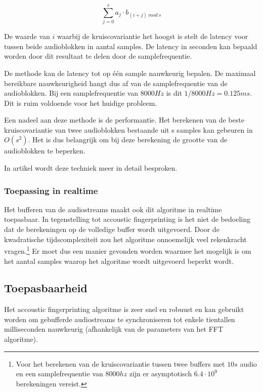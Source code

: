\begin{equation}
\sum_{j=0}^{s} a_{j} \cdot b_{(i+j)\ mod\ s}
\end{equation}

De waarde van $ i $ waarbij de kruiscovariantie het hoogst is stelt de latency voor tussen beide audioblokken in aantal samples. De latency in seconden kan bepaald worden door dit resultaat te delen door de samplefrequentie.

De methode kan de latency tot op één sample nauwkeurig bepalen. De maximaal bereikbare nauwkeurigheid hangt dus af van de samplefrequentie van de audioblokken. Bij een samplefrequentie van $8000 Hz$ is dit $ 1/8000 Hz = 0.125 ms $. Dit is ruim voldoende voor het huidige probleem.

Een nadeel aan deze methode is de performantie. Het berekenen van de beste kruiscovariantie van twee audioblokken bestaande uit s samples kan gebeuren in  $O(s^{2})$. Het is dus belangrijk om bij deze berekening de grootte van de audioblokken te beperken.

In artikel \cite{six2015multimodal} wordt deze techniek meer in detail besproken.

\subsubsection{Toepassing in realtime}

Het bufferen van de audiostreams maakt ook dit algoritme in realtime toepasbaar. In tegenstelling tot accoustic fingerprinting is het niet de bedoeling dat de berekeningen op de volledige buffer wordt uitgevoerd. Door de kwadratische tijdscomplexiteit zou het algoritme onnoemelijk veel rekenkracht vragen.\footnote{Voor het berekenen van de kruiscovariantie tussen twee buffers met $10s$ audio en een samplefrequentie van $8000hz$ zijn er asymptotisch $ 6.4 \cdot 10^9 $ berekeningen vereist.} Er moet dus een manier gevonden worden waarmee het mogelijk is om het aantal samples waarop het algoritme wordt uitgevoerd beperkt wordt.

\subsection{Toepasbaarheid}

Het accoustic fingerprinting algoritme is zeer snel en robuust en kan gebruikt worden om gebufferde audiostreams te synchroniseren tot enkele tientallen milliseconden nauwkeurig (afhankelijk van de parameters van het FFT algoritme).

